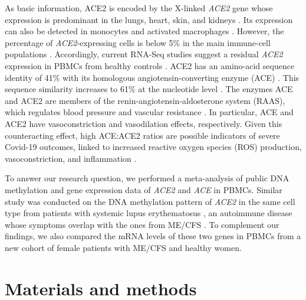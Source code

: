 As basic information, ACE2 is encoded by the X-linked \textit{ACE2} gene whose expression is predominant in the lungs, heart, skin, and kidneys \citep{hamming2004TissueDistribution, to2004ExploringPathogenesis, li2020ExpressionSARSCoV2, radzikowska2020DistributionACE2}. Its expression can also be detected in monocytes \citep{rutkowska-zapala2015HumanMonocyte} and activated macrophages \citep{song2023LittleNo}. However, the percentage of \textit{ACE2}-expressing cells is below 5\% in the main immune-cell populations \citep{song2023LittleNo}. Accordingly, current RNA-Seq studies suggest a residual \textit{ACE2} expression in PBMCs from healthy controls \citep{radzikowska2020DistributionACE2}. ACE2 has an amino-acid sequence identity of 41\% with its homologous angiotensin-converting enzyme (ACE) \citep{tipnis2000HumanHomolog}. This sequence similarity increases to 61\% at the nucleotide level \citep{tipnis2000HumanHomolog}. The enzymes ACE and ACE2 are members of the renin-angiotensin-aldosterone system (RAAS), which regulates blood pressure and vascular resistance \citep{westermeier2015NovelPlayers}. In particular, ACE and ACE2 have vasoconstriction and vasodilation effects, respectively. Given this counteracting effect, high ACE:ACE2 ratios are possible indicators of severe Covid-19 outcomes, linked to increased reactive oxygen species (ROS) production, vasoconstriction, and inflammation \citep{pagliaro2020ACEACE2}.

To answer our research question, we performed a meta-analysis of public DNA methylation and gene expression data of \textit{ACE2} and \textit{ACE} in PBMCs. Similar study was conducted on the DNA methylation pattern of \textit{ACE2} in the same cell type from patients with systemic lupus erythematosus \citep{sawalha2020EpigeneticDysregulation}, an autoimmune disease whose symptoms overlap with the ones from ME/CFS \citep{blomberg2018InfectionEliciteda}. To complement our findings, we also compared the mRNA levels of these two genes in PBMCs from a new cohort of female patients with ME/CFS and healthy women.

\section{Materials and methods}

